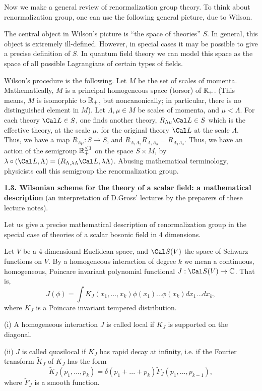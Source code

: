 Now we make a general review of renormalization group theory. 
To think about renormalization group, one can use 
the following general picture, due to Wilson.

The central object in Wilson's picture is ``the space of theories'' $S$.
In general, this object is extremely ill-defined. However, in special cases
it may be possible to give a precise definition of $S$.
In quantum field theory 
we can model this space as the space of all possible Lagrangians  
of certain types of fields. 

Wilson's procedure is the following. Let $M$ be the set of 
scales of momenta. Mathematically, $M$ is a principal 
homogeneous space (torsor) of $\Bbb R_+$.
(This means, $M$ is isomorphic to $\Bbb R_+$, but noncanonically; 
in particular, there is no distinguished element in $M$).
Let $\Lambda,\mu\in M$ be scales of momenta,
and $\mu<\Lambda$. 
For each theory $\Cal L\in S$, one finds another theory, 
$R_{\Lambda\mu}\Cal L\in S$ which is the 
effective theory, 
at the scale $\mu$, for the original theory $\Cal L$ at 
the scale $\Lambda$. Thus, we have a map $R_{\Lambda\mu}:S\to S$,
and $R_{\Lambda_1\Lambda_2}R_{\Lambda_2\Lambda_3}=R_{\Lambda_1\Lambda_3}$. Thus, we have an action 
of the semigroup $\Bbb R_+^{\le 1}$ on the space $S\times M$,
by $\l\circ (\Cal L,\Lambda)=
(R_{\Lambda,\l \Lambda}\Cal L,\l \Lambda)$. Abusing mathematical
terminology, physicists call this semigroup 
the renormalization group. 

{\bf 1.3. Wilsonian scheme for the theory of a scalar field:
a mathematical description} (an interpretation of D.Gross' lectures
by the preparers of these lecture notes). 

Let us give a precise mathematical description of renormalization group
in the special case of theories of a scalar bosonic field in 4 dimensions. 

Let $V$ be a 4-dimensional Euclidean space, 
and $\Cal S(V)$ the space of Schwarz functions 
on $V$. By a homogeneous interaction of degree $k$ we mean 
a continuous, homogeneous,
Poincare invariant polynomial functional $J: \Cal S(V)\to\C$.
That is, 
$$
J(\phi)=\int K_J(x_1,...,x_k)\phi(x_1)...\phi(x_k)dx_1...dx_k,
$$
where $K_J$ is a Poincare invariant tempered distribution. 

 (i) A homogeneous interaction $J$ 
is called
local if $K_J$ is supported on the diagonal. 
 
(ii) $J$ is called quasilocal if
$K_J$ has rapid decay at infinity, i.e. if  
the Fourier transform $\tilde K_J$ of $K_J$ has the form
$$
\tilde K_J(p_1,...,p_k)=\delta(p_1+...+p_k)\tilde F_J(p_1,...,p_{k-1}),
$$
where $\tilde F_J$ is a smooth function.

